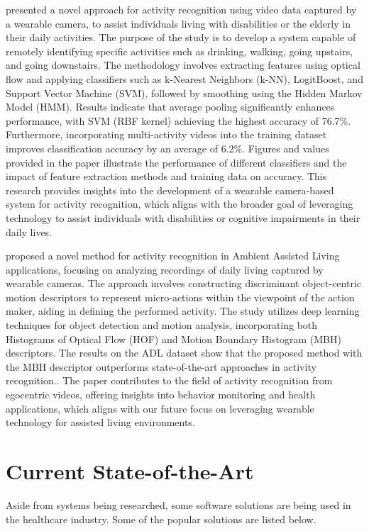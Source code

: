 \cite{wearable-cams1} presented a novel approach for activity recognition using video data captured by a wearable camera, to assist individuals living with disabilities or the elderly in their daily activities. The purpose of the study is to develop a system capable of remotely identifying specific activities such as drinking, walking, going upstairs, and going downstairs. The methodology involves extracting features using optical flow and applying classifiers such as k-Nearest Neighbors (k-NN), LogitBoost, and Support Vector Machine (SVM), followed by smoothing using the Hidden Markov Model (HMM). Results indicate that average pooling significantly enhances performance, with SVM (RBF kernel) achieving the highest accuracy of 76.7\%. Furthermore, incorporating multi-activity videos into the training dataset improves classification accuracy by an average of 6.2\%. Figures and values provided in the paper illustrate the performance of different classifiers and the impact of feature extraction methods and training data on accuracy. This research provides insights into the development of a wearable camera-based system for activity recognition, which aligns with the broader goal of leveraging technology to assist individuals with disabilities or cognitive impairments in their daily lives.

\cite{wearable-cams2} proposed a novel method for activity recognition in Ambient Assisted Living applications, focusing on analyzing recordings of daily living captured by wearable cameras. The approach involves constructing discriminant object-centric motion descriptors to represent micro-actions within the viewpoint of the action maker, aiding in defining the performed activity. The study utilizes deep learning techniques for object detection and motion analysis, incorporating both Histograms of Optical Flow (HOF) and Motion Boundary Histogram (MBH) descriptors. The results on the ADL dataset show that the proposed method with the MBH descriptor outperforms state-of-the-art approaches in activity recognition.. The paper contributes to the field of activity recognition from egocentric videos, offering insights into behavior monitoring and health applications, which aligns with our future focus on leveraging wearable technology for assisted living environments. 

\section{Current State-of-the-Art}
Aside from systems being researched, some software solutions are being used in the healthcare industry. Some of the popular solutions are listed below.
